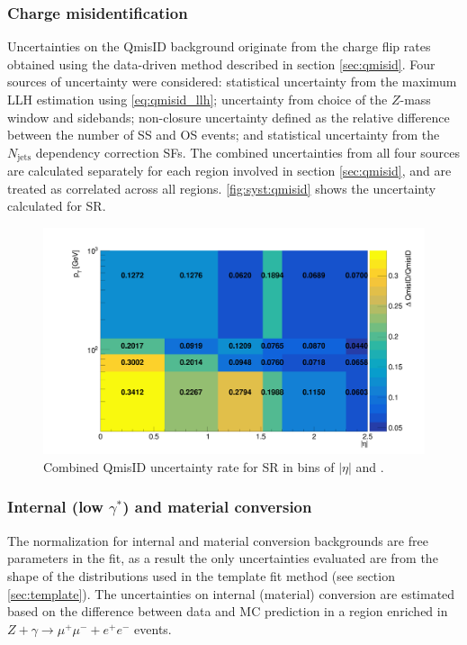 \documentclass[../thesis.tex]{subfiles}
\begin{document}
\subsubsection*{Charge misidentification}
Uncertainties on the \acs{QmisID} background originate from the charge flip rates obtained using the data-driven method described in section \ref{sec:qmisid}. Four sources of uncertainty were considered: statistical uncertainty from the maximum \acs{LLH} estimation using \autoref{eq:qmisid_llh}; uncertainty from choice of the $Z$-mass window and sidebands; non-closure uncertainty defined as the relative difference between the number of \acs{SS} and \acs{OS} events; and statistical uncertainty from the $N_\text{jets}$ dependency correction \acs{SF}s. The combined uncertainties from all four sources are calculated separately for each region involved in section \ref{sec:qmisid}, and are treated as correlated across all regions. \autoref{fig:syst:qmisid} shows the uncertainty calculated for \acs{SR}.

\begin{figure}[!htb]
\begin{center}
\includegraphics[width=0.9\linewidth]{fig/syst_qmisid_combined.png}
\caption{\label{fig:syst:qmisid}Combined \acs{QmisID} uncertainty rate for \acs{SR} in bins of $|\eta|$ and \pT.}
\end{center}
\end{figure}


\subsubsection*{Internal (low $\gamma^{*}$) and material conversion}
The normalization for internal and material conversion backgrounds are free parameters in the fit, as a result the only uncertainties evaluated are from the shape of the distributions used in the template fit method (see section \ref{sec:template}). The uncertainties on internal (material) conversion are estimated based on the difference between data and \acs{MC} prediction in a region enriched in $Z+\gamma \rightarrow \mu^+\mu^- + e^+e^-$ events.
\end{document}
